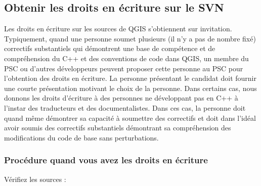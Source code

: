 \subsection{Obtenir les droits en écriture sur le SVN}
Les droits en écriture sur les sources de QGIS s'obtiennent sur invitation. Typiquement, quand une personne soumet plusieurs (il n'y a pas de nombre fixé) correctifs substantiels qui démontrent une base de compétence et de compréhension du C++ et des conventions de code dans QGIS, un membre du PSC ou d'autres développeurs peuvent proposer cette personne au PSC pour l'obtention des droits en écriture. La personne présentant le candidat doit fournir une courte présentation motivant le choix de la personne. Dans certains cas, nous donnons les droits d'écriture à des personnes ne développant pas en C++ à l'instar des traducteurs et des documentalistes. Dans ces cas, la personne doit quand même démontrer sa capacité à soumettre des correctifs et doit dans l'idéal avoir soumis des correctifs substantiels démontrant sa compréhension des modifications du code de base sans perturbations.

\subsubsection{Procédure quand vous avez les droits en écriture}
Vérifiez les sources :

